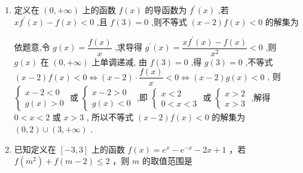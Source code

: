 \begin{enumerate}
\begin{enumerate}
\begin{jieda}
        \end{jieda}
        \item 定义在 $\left( {0, + \infty }\right)$ 上的函数 $f\left( x\right)$ 的导函数为 ${f}^{\prime }\left( x\right)$ ,若 $x{f}^{\prime }\left( x\right)  - f\left( x\right)  < 0$ ,且 $f\left( 3\right)  = 0$ ,则不等式 $\left( {x - 2}\right) f\left( x\right)  < 0$ 的解集为
        \begin{jieda}
            依题意,令 $g\left( x\right)  = \dfrac{f\left( x\right) }{x}$ ,求导得 ${g}^{\prime }\left( x\right)  = \dfrac{x{f}^{\prime }\left( x\right)  - f\left( x\right) }{{x}^{2}} < 0$ ,则 $g\left( x\right)$ 在 $\left( {0, + \infty }\right)$ 上单调递减, 由 $f\left( 3\right)  = 0$ ,得 $g\left( 3\right)  = 0$ ,不等式 $\left( {x - 2}\right) f\left( x\right)  < 0 \Longleftrightarrow  \left( {x - 2}\right)  \cdot  \dfrac{f\left( x\right) }{x} < 0 \Longleftrightarrow  \left( {x - 2}\right) g\left( x\right)  < 0$ , 则 $\left\{  \begin{array}{l} x - 2 < 0 \\  g\left( x\right)  > 0 \end{array}\right.$ 或 $\left\{  \begin{array}{l} x - 2 > 0 \\  g\left( x\right)  < 0 \end{array}\right.$ ,即 $\left\{  \begin{matrix} x < 2 \\  0 < x < 3 \end{matrix}\right.$ 或 $\left\{  \begin{array}{l} x > 2 \\  x > 3 \end{array}\right.$ ,解得 $0 < x < 2$ 或 $x > 3$ , 所以不等式 $\left( {x - 2}\right) f\left( x\right)  < 0$ 的解集为 $\left( {0,2}\right)  \cup  \left( {3, + \infty }\right)$ .
        \end{jieda}
        
        \item 已知定义在 $\left\lbrack  {-3,3}\right\rbrack$ 上的函数 $f\left( x\right)  = {{e}}^{x} - {{e}}^{-x} - {2x} + 1$ ，若 $f\left( {m}^{2}\right)  +  f\left( {m - 2}\right)  \leq  2$ ，则 $m$ 的取值范围是


\end{enumerate}
\end{enumerate}
